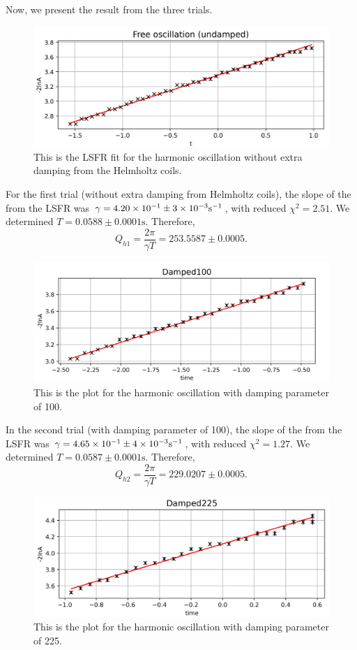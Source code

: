 \documentclass[a4paper,12pt]{article}
\begin{document}
Now, we present the result from the three trials.
\begin{figure}[h]
	\centering
	\includegraphics[scale=0.5]{images/free_undamped_LSFR.png}
	\caption{This is the LSFR fit for the harmonic oscillation without extra damping from the Helmholtz coils.}
\end{figure}
For the first trial (without extra damping from Helmholtz coils), the slope of the from the LSFR was \( \gamma = \num{4.20d-1} \pm \num{3d-3} \unit{\per\second} \), with reduced \( \chi^2 = 2.51 \). We determined \( T = 0.0588 \pm 0.0001 \unit{\second} \). Therefore,
\begin{equation}
	Q_{h1} = \frac{2\pi}{\gamma T} = 253.5587 \pm 0.0005.
\end{equation} 
\begin{figure}[h]
	\centering
	\includegraphics[scale=0.5]{images/damped100.png}
	\caption{This is the plot for the harmonic oscillation with damping parameter of 100.}
\end{figure}
In the second trial (with damping parameter of 100), the slope of the from the LSFR was \( \gamma = \num{4.65d-1} \pm \num{4d-3} \unit{\per\second} \), with reduced \( \chi^2 = 1.27 \). We determined \( T = 0.0587 \pm 0.0001 \unit{\second} \). Therefore,
\begin{equation}
	Q_{h2} = \frac{2\pi}{\gamma T} = 229.0207 \pm 0.0005.
\end{equation} 
\begin{figure}[h]
	\centering
	\includegraphics[scale=0.5]{images/damped225.png}
	\caption{This is the plot for the harmonic oscillation with damping parameter of 225.}
\end{figure}
\end{document}
